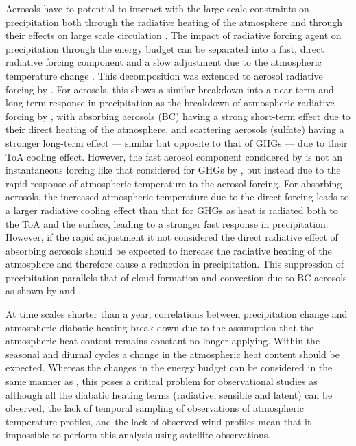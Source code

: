 Aerosols have to potential to interact with the large scale constraints on precipitation both through the radiative heating of the atmosphere \citep{suzuki_perturbations_2019} and through their effects on large scale circulation \citep{bollasina_anthropogenic_2011, nober_sensitivity_2003}. 
The impact of radiative forcing agent on precipitation through the energy budget can be separated into a fast, direct radiative forcing component and a slow adjustment due to the atmospheric temperature change \citep{allen_constraints_2002}. This decomposition was extended to aerosol radiative forcing by \citet{richardson_drivers_2018}. For aerosols, this shows a similar breakdown into a near-term and long-term response in precipitation as the breakdown of atmospheric radiative forcing by \citet{suzuki_perturbations_2019}, with absorbing aerosols (BC) having a strong short-term effect due to their direct heating of the atmosphere, and scattering aerosols (sulfate) having a stronger long-term effect --- similar but opposite to that of GHGs --- due to their ToA cooling effect.
However, the fast aerosol component considered by \citet{richardson_drivers_2018} is not an instantaneous forcing like that considered for GHGs by \citet{allen_constraints_2002}, but instead due to the rapid response of atmospheric temperature to the aerosol forcing.
For absorbing aerosols, the increased atmospheric temperature due to the direct forcing leads to a larger radiative cooling effect than that for GHGs as heat is radiated both to the ToA and the surface, leading to a stronger fast response in precipitation. 
However, if the rapid adjustment it not considered the direct radiative effect of absorbing aerosols should be expected to increase the radiative heating of the atmosphere and therefore cause a reduction in precipitation.
This suppression of precipitation parallels that of cloud formation and convection due to BC aerosols as shown by \citet{koren_smoke_2008} and \citet{fan_effects_2008}.

At time scales shorter than a year, correlations between precipitation change and atmospheric diabatic heating break down \citep{nogueira_multi-scale_2019} due to the assumption that the atmospheric heat content remains constant no longer applying.
Within the seasonal and diurnal cycles a change in the atmospheric heat content should be expected.
Whereas the changes in the energy budget can be considered in the same manner as \citet{muller_energetic_2011}, this poses a critical problem for observational studies as although all the diabatic heating terms (radiative, sensible and latent) can be observed, the lack of temporal sampling of observations of atmospheric temperature profiles, and the lack of observed wind profiles mean that it impossible to perform this analysis using satellite observations.




